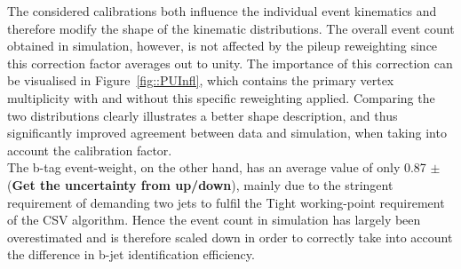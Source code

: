 The considered calibrations both influence the individual event kinematics and therefore modify the shape of the kinematic distributions.
The overall event count obtained in simulation, however, is not affected by the pileup reweighting since this correction factor averages out to unity.
The importance of this correction can be visualised in Figure~\ref{fig::PUInfl}, which contains the primary vertex multiplicity with and without this specific reweighting applied.
Comparing the two distributions clearly illustrates a better shape description, and thus significantly improved agreement between data and simulation, when taking into account the calibration factor.
\\
The b-tag event-weight, on the other hand, has an average value of only 0.87 $\pm$  (\textbf{Get the uncertainty from up/down}), mainly due to the stringent requirement of demanding two jets to fulfil the Tight working-point requirement of the CSV algorithm.
Hence the event count in simulation has largely been overestimated and is therefore scaled down in order to correctly take into account the difference in b-jet identification efficiency.
%
%

